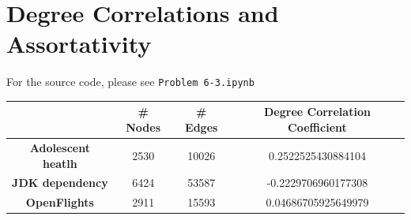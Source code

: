 \section{Degree Correlations and Assortativity}
For the source code, please see \texttt{Problem 6-3.ipynb}\\

\begin{tabular}{c  c c c}
  & \textbf{\#  Nodes}&  \textbf{\# Edges}&\textbf{ Degree Correlation Coefficient}\\
\hline
 \textbf{ Adolescent heatlh}& 2530& 10026&0.2522525430884104 \\
  \textbf{JDK dependency}&6424 &53587 &  -0.2229706960177308\\
  \textbf{OpenFlights}&2911 &15593 & 0.04686705925649979\\
\end{tabular}

